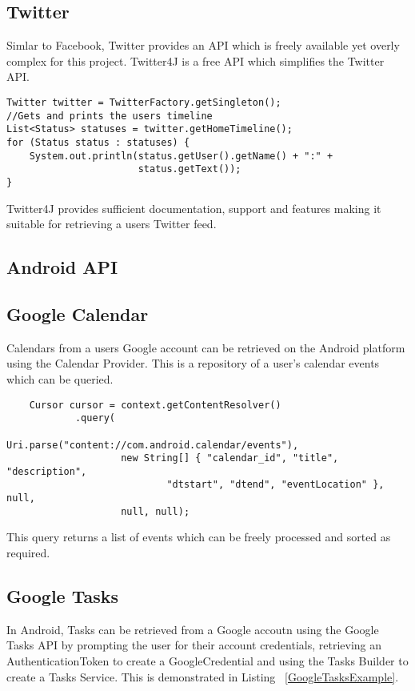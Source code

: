 \subsection{Twitter}

Simlar to Facebook, Twitter provides an API which is freely available yet overly complex for this project. Twitter4J is a free API which simplifies the Twitter API.

\begin{lstlisting}
Twitter twitter = TwitterFactory.getSingleton();
//Gets and prints the users timeline
List<Status> statuses = twitter.getHomeTimeline();
for (Status status : statuses) {
    System.out.println(status.getUser().getName() + ":" +
                       status.getText());
}
\end{lstlisting}

Twitter4J provides sufficient documentation, support and features making it suitable for retrieving a users Twitter feed.  

\subsection{Android API}
\subsection{Google Calendar}
Calendars from a users Google account can be retrieved on the Android platform using the Calendar Provider. This is a repository of a user's calendar events which can be queried.

\lstset{language=Java, caption=Calendar Provider example }
\begin{lstlisting}
    Cursor cursor = context.getContentResolver()
            .query(
                    Uri.parse("content://com.android.calendar/events"),
                    new String[] { "calendar_id", "title", "description",
                            "dtstart", "dtend", "eventLocation" }, null,
                    null, null);
\end{lstlisting}

This query returns a list of events which can be freely processed and sorted as required. 
\subsection{Google Tasks}
In Android, Tasks can be retrieved from a Google accoutn using the Google Tasks API by prompting the user for their account credentials, retrieving an AuthenticationToken to create a GoogleCredential and using the Tasks Builder to create a Tasks Service. This is demonstrated in Listing ~\ref{GoogleTasksExample}.

